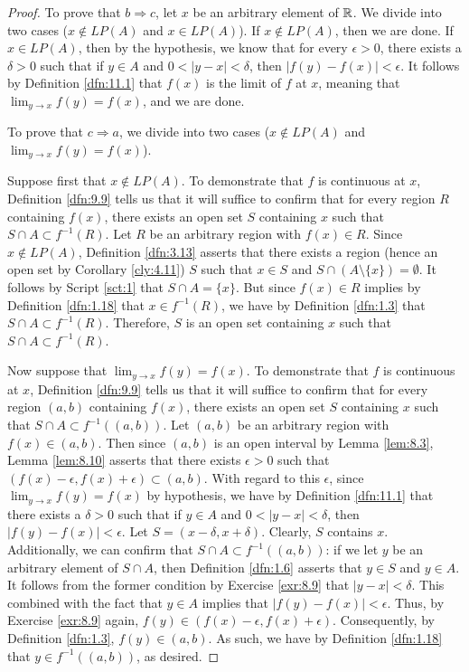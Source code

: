 \documentclass[../main.tex]{subfiles}
\begin{document}
\begin{theorem}
\begin{proof}
        To prove that $b\Rightarrow c$, let $x$ be an arbitrary element of $\mathbb{R}$. We divide into two cases ($x\notin LP(A)$ and $x\in LP(A)$). If $x\notin LP(A)$, then we are done. If $x\in LP(A)$, then by the hypothesis, we know that for every $\epsilon>0$, there exists a $\delta>0$ such that if $y\in A$ and $0<|y-x|<\delta$, then $|f(y)-f(x)|<\epsilon$. It follows by Definition \ref{dfn:11.1} that $f(x)$ is the limit of $f$ at $x$, meaning that $\lim_{y\to x}f(y)=f(x)$, and we are done.\par\smallskip
        To prove that $c\Rightarrow a$, we divide into two cases ($x\notin LP(A)$ and $\lim_{y\to x}f(y)=f(x)$).\par
        Suppose first that $x\notin LP(A)$. To demonstrate that $f$ is continuous at $x$, Definition \ref{dfn:9.9} tells us that it will suffice to confirm that for every region $R$ containing $f(x)$, there exists an open set $S$ containing $x$ such that $S\cap A\subset f^{-1}(R)$. Let $R$ be an arbitrary region with $f(x)\in R$. Since $x\notin LP(A)$, Definition \ref{dfn:3.13} asserts that there exists a region (hence an open set by Corollary \ref{cly:4.11}) $S$ such that $x\in S$ and $S\cap(A\setminus\{x\})=\emptyset$. It follows by Script \ref{sct:1} that $S\cap A=\{x\}$. But since $f(x)\in R$ implies by Definition \ref{dfn:1.18} that $x\in f^{-1}(R)$, we have by Definition \ref{dfn:1.3} that $S\cap A\subset f^{-1}(R)$. Therefore, $S$ is an open set containing $x$ such that $S\cap A\subset f^{-1}(R)$.\par
        Now suppose that $\lim_{y\to x}f(y)=f(x)$. To demonstrate that $f$ is continuous at $x$, Definition \ref{dfn:9.9} tells us that it will suffice to confirm that for every region $(a,b)$ containing $f(x)$, there exists an open set $S$ containing $x$ such that $S\cap A\subset f^{-1}((a,b))$. Let $(a,b)$ be an arbitrary region with $f(x)\in(a,b)$. Then since $(a,b)$ is an open interval by Lemma \ref{lem:8.3}, Lemma \ref{lem:8.10} asserts that there exists $\epsilon>0$ such that $(f(x)-\epsilon,f(x)+\epsilon)\subset(a,b)$. With regard to this $\epsilon$, since $\lim_{y\to x}f(y)=f(x)$ by hypothesis, we have by Definition \ref{dfn:11.1} that there exists a $\delta>0$ such that if $y\in A$ and $0<|y-x|<\delta$, then $|f(y)-f(x)|<\epsilon$. Let $S=(x-\delta,x+\delta)$. Clearly, $S$ contains $x$. Additionally, we can confirm that $S\cap A\subset f^{-1}((a,b))$: if we let $y$ be an arbitrary element of $S\cap A$, then Definition \ref{dfn:1.6} asserts that $y\in S$ and $y\in A$. It follows from the former condition by Exercise \ref{exr:8.9} that $|y-x|<\delta$. This combined with the fact that $y\in A$ implies that $|f(y)-f(x)|<\epsilon$. Thus, by Exercise \ref{exr:8.9} again, $f(y)\in(f(x)-\epsilon,f(x)+\epsilon)$. Consequently, by Definition \ref{dfn:1.3}, $f(y)\in(a,b)$. As such, we have by Definition \ref{dfn:1.18} that $y\in f^{-1}((a,b))$, as desired.
    \end{proof}
\end{theorem}
\end{document}
